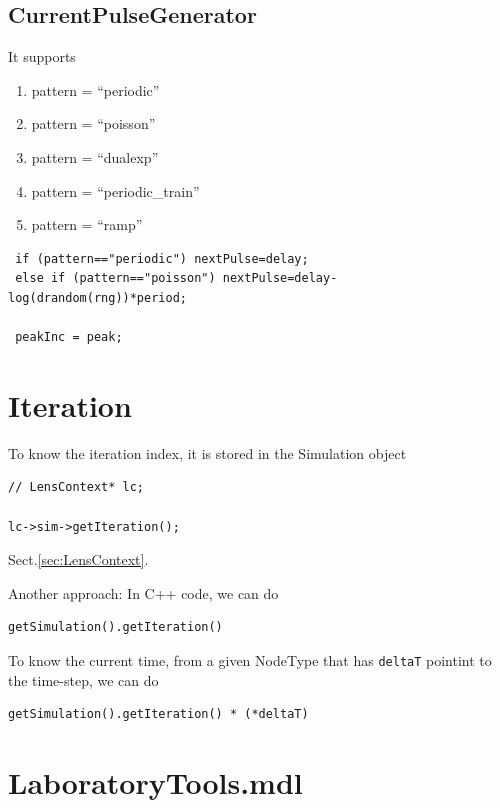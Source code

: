 \subsection{CurrentPulseGenerator}
\label{sec:CurrentPulseGenerator}

It supports
\begin{enumerate}
  \item pattern = ``periodic''
  
  \item pattern = ``poisson''
  
  \item pattern = ``dualexp''
  
  \item pattern = ``periodic\_train''
  
  \item pattern = ``ramp''
\end{enumerate}


\begin{lstlisting}
 if (pattern=="periodic") nextPulse=delay;
 else if (pattern=="poisson") nextPulse=delay-log(drandom(rng))*period;
 
 peakInc = peak;
\end{lstlisting}

\section{Iteration}

To know the iteration index, it is stored in the Simulation object
\begin{verbatim}
// LensContext* lc;

lc->sim->getIteration();
\end{verbatim}
Sect.\ref{sec:LensContext}.

Another approach: In C++ code, we can do
\begin{verbatim}
getSimulation().getIteration()
\end{verbatim}

To know the current time, from a given NodeType that has \verb!deltaT!
pointint to the time-step, we can do
\begin{verbatim}
getSimulation().getIteration() * (*deltaT)
\end{verbatim}


\section{LaboratoryTools.mdl}
\label{sec:LaboratoryTools.mdl}

